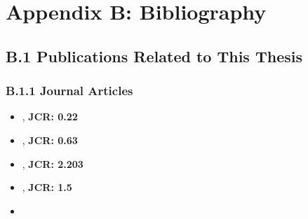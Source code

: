 
\chapter*{\vspace{-2.3cm} \Large Appendix B: Bibliography \vspace{1.7cm}}
\label{chap:pub}

\fancyhead[LO]{}

\section*{B.1 Publications Related to This Thesis}
\label{sec:pub:thesis}

\subsection*{B.1.1 Journal Articles}

\begin{itemize}

\item {}, \textbf{JCR: 0.22}
\item {}, \textbf{JCR: 0.63}
\item {}, \textbf{JCR: 2.203}
\item {}, \textbf{JCR: 1.5}
\item {}

\end{itemize}

